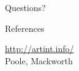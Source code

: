\documentclass[10pt]{beamer}
\begin{document}
\begin{frame}[standout]
    Questions?
\end{frame}

\appendix

\begin{frame}[allowframebreaks]{References}

    
    
    \url{http://artint.info/}\\
    Poole, Mackworth

\end{frame}
\end{document}
